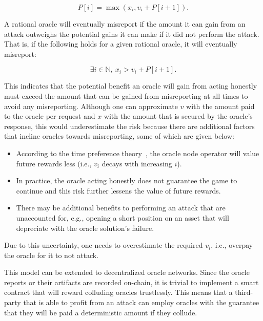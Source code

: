 \documentclass[11pt]{article}
\begin{document}
\begin{equation}
P \left[ i \right] = \max \left( x_i, v_i + P \left[ i + 1 \right] \right).
\end{equation}

A rational oracle will eventually misreport if the amount it can gain from an attack outweighs the potential gains it can make if it did not perform the attack.
That is, if the following holds for a given rational oracle, it will eventually misreport:

\begin{equation}
\exists i \in \mathbb{N},~ x_i > v_i + P \left[ i + 1 \right].
\end{equation}

This indicates that the potential benefit an oracle will gain from acting honestly must exceed the amount that can be gained from misreporting at all times to avoid any misreporting.
Although one can approximate $v$ with the amount paid to the oracle per-request and $x$ with the amount that is secured by the oracle’s response, this would underestimate the risk because there are additional factors that incline oracles towards misreporting, some of which are given below:

\begin{itemize}
    \item According to the time preference theory~\cite{frederick:2002}, the oracle node operator will value future rewards less (i.e., $v_i$ decays with increasing $i$).
    \item In practice, the oracle acting honestly does not guarantee the game to continue and this risk further lessens the value of future rewards.
    \item There may be additional benefits to performing an attack that are unaccounted for, e.g., opening a short position on an asset that will depreciate with the oracle solution’s failure.
\end{itemize}

Due to this uncertainty, one needs to overestimate the required $v_i$, i.e., overpay the oracle for it to not attack.

This model can be extended to decentralized oracle networks.
Since the oracle reports or their artifacts are recorded on-chain, it is trivial to implement a smart contract that will reward colluding oracles trustlessly.
This means that a third-party that is able to profit from an attack can employ oracles with the guarantee that they will be paid a deterministic amount if they collude.
\end{document}
